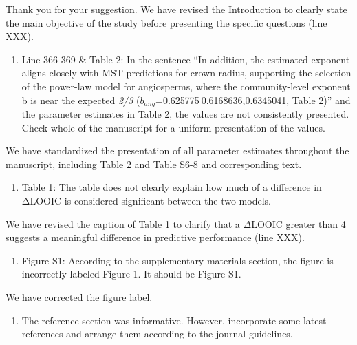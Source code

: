 \documentclass[
  12pt,
  letterpaper,
  DIV=11,
  numbers=noendperiod]{scrartcl}
\providecommand{\tightlist}{%
  \setlength{\itemsep}{0pt}\setlength{\parskip}{0pt}}\usepackage{longtable,booktabs,array}
\renewenvironment{quote}
  {\begin{customblockquote}\color{blockquote-text}\ignorespaces}
  {\end{customblockquote}}
\begin{document}
Thank you for your suggestion. We have revised the Introduction to
clearly state the main objective of the study before presenting the
specific questions (line XXX).

\begin{quote}
\begin{enumerate}
\def\labelenumi{\arabic{enumi})}
\setcounter{enumi}{3}
\tightlist
\item
  Line 366-369 \& Table 2: In the sentence ``In addition, the estimated
  exponent aligns closely with MST predictions for crown radius,
  supporting the selection of the power-law model for angiosperms, where
  the community-level exponent b is near the expected \emph{2/3}
  (\(b_{ang}\)=0.625775 0.6168636,0.6345041, Table 2)'' and the
  parameter estimates in Table 2, the values are not consistently
  presented. Check whole of the manuscript for a uniform presentation of
  the values.
\end{enumerate}
\end{quote}

We have standardized the presentation of all parameter estimates
throughout the manuscript, including Table 2 and Table S6-8 and
corresponding text.

\begin{quote}
\begin{enumerate}
\def\labelenumi{\arabic{enumi})}
\setcounter{enumi}{4}
\tightlist
\item
  Table 1: The table does not clearly explain how much of a difference
  in ΔLOOIC is considered significant between the two models.
\end{enumerate}
\end{quote}

We have revised the caption of Table 1 to clarify that a \(\Delta\)LOOIC
greater than 4 suggests a meaningful difference in predictive
performance (line XXX).

\begin{quote}
\begin{enumerate}
\def\labelenumi{\arabic{enumi})}
\setcounter{enumi}{5}
\tightlist
\item
  Figure S1: According to the supplementary materials section, the
  figure is incorrectly labeled Figure 1. It should be Figure S1.
\end{enumerate}
\end{quote}

We have corrected the figure label.

\begin{quote}
\begin{enumerate}
\def\labelenumi{\arabic{enumi})}
\setcounter{enumi}{6}
\tightlist
\item
  The reference section was informative. However, incorporate some
  latest references and arrange them according to the journal
  guidelines.
\end{enumerate}
\end{quote}
\end{document}
